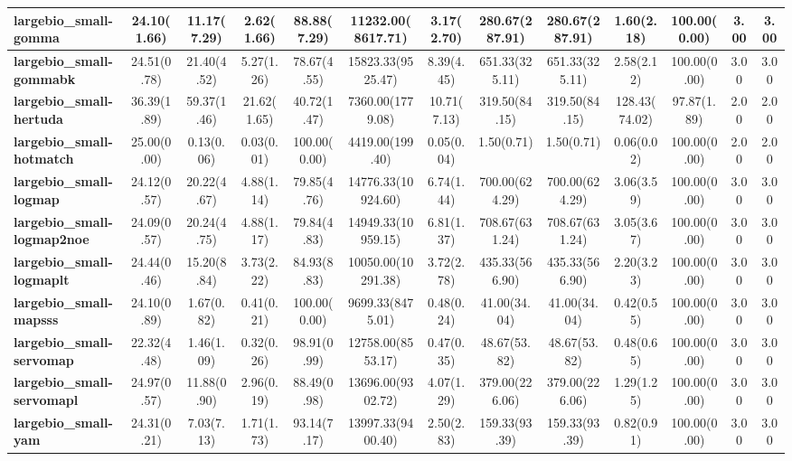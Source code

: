 \begin{tabular}{|l|c|c|c|c|c|c|c|c|c|c|c|c|}
\textbf{largebio\_small-gomma}&24.10(1.66)&11.17(7.29)&2.62(1.66)&88.88(7.29)&11232.00(8617.71)&3.17(2.70)&280.67(287.91)&280.67(287.91)&1.60(2.18)&100.00(0.00)&3.00&3.00\\\hline
\textbf{largebio\_small-gommabk}&24.51(0.78)&21.40(4.52)&5.27(1.26)&78.67(4.55)&15823.33(9525.47)&8.39(4.45)&651.33(325.11)&651.33(325.11)&2.58(2.12)&100.00(0.00)&3.00&3.00\\\hline
\textbf{largebio\_small-hertuda}&36.39(1.89)&59.37(1.46)&21.62(1.65)&40.72(1.47)&7360.00(1779.08)&10.71(7.13)&319.50(84.15)&319.50(84.15)&128.43(74.02)&97.87(1.89)&2.00&2.00\\\hline
\textbf{largebio\_small-hotmatch}&25.00(0.00)&0.13(0.06)&0.03(0.01)&100.00(0.00)&4419.00(199.40)&0.05(0.04)&1.50(0.71)&1.50(0.71)&0.06(0.02)&100.00(0.00)&2.00&2.00\\\hline
\textbf{largebio\_small-logmap}&24.12(0.57)&20.22(4.67)&4.88(1.14)&79.85(4.76)&14776.33(10924.60)&6.74(1.44)&700.00(624.29)&700.00(624.29)&3.06(3.59)&100.00(0.00)&3.00&3.00\\\hline
\textbf{largebio\_small-logmap2noe}&24.09(0.57)&20.24(4.75)&4.88(1.17)&79.84(4.83)&14949.33(10959.15)&6.81(1.37)&708.67(631.24)&708.67(631.24)&3.05(3.67)&100.00(0.00)&3.00&3.00\\\hline
\textbf{largebio\_small-logmaplt}&24.44(0.46)&15.20(8.84)&3.73(2.22)&84.93(8.83)&10050.00(10291.38)&3.72(2.78)&435.33(566.90)&435.33(566.90)&2.20(3.23)&100.00(0.00)&3.00&3.00\\\hline
\textbf{largebio\_small-mapsss}&24.10(0.89)&1.67(0.82)&0.41(0.21)&100.00(0.00)&9699.33(8475.01)&0.48(0.24)&41.00(34.04)&41.00(34.04)&0.42(0.55)&100.00(0.00)&3.00&3.00\\\hline
\textbf{largebio\_small-servomap}&22.32(4.48)&1.46(1.09)&0.32(0.26)&98.91(0.99)&12758.00(8553.17)&0.47(0.35)&48.67(53.82)&48.67(53.82)&0.48(0.65)&100.00(0.00)&3.00&3.00\\\hline
\textbf{largebio\_small-servomapl}&24.97(0.57)&11.88(0.90)&2.96(0.19)&88.49(0.98)&13696.00(9302.72)&4.07(1.29)&379.00(226.06)&379.00(226.06)&1.29(1.25)&100.00(0.00)&3.00&3.00\\\hline
\textbf{largebio\_small-yam}&24.31(0.21)&7.03(7.13)&1.71(1.73)&93.14(7.17)&13997.33(9400.40)&2.50(2.83)&159.33(93.39)&159.33(93.39)&0.82(0.91)&100.00(0.00)&3.00&3.00\\\hline
\end{tabular}
